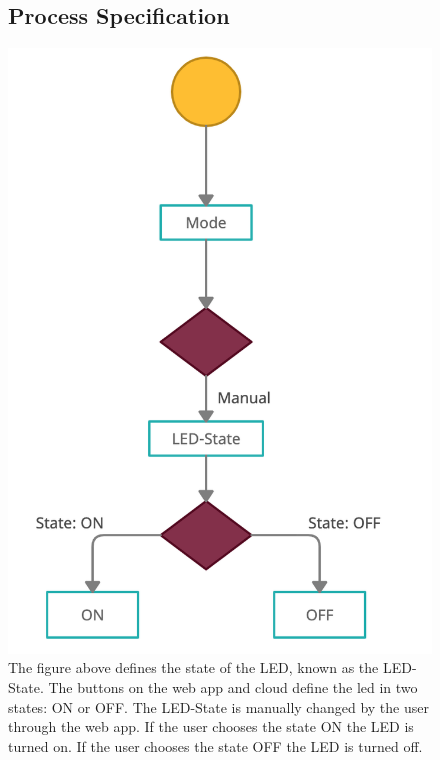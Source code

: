 \documentclass{report}
\begin{document}
\begin{figure}
\subsection{Process Specification}
    \centering
    \includegraphics[scale=0.2]{images/step2.png}
    \caption{The figure above defines the state of the LED, known as the LED-State. The buttons on the web app and cloud define the led in two states: ON or OFF. The LED-State is manually changed by the user through the web app. If the user chooses the state ON the LED is turned on. If the user chooses the state OFF the LED is turned off.}
    \label{fig:image1}
\end{figure}
\end{document}
